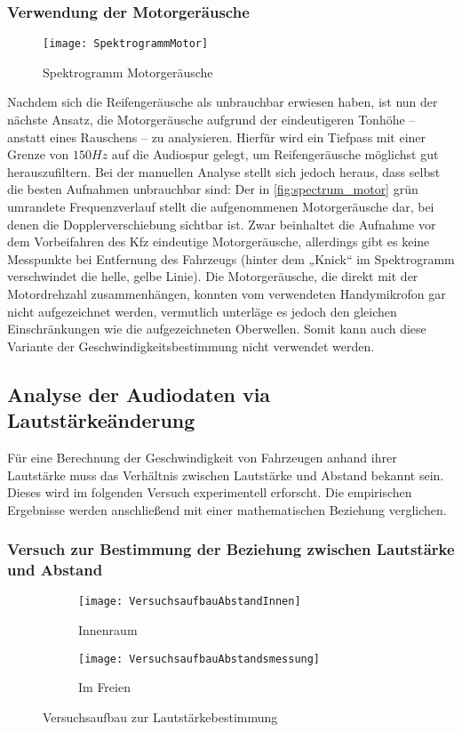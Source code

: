\subsubsection{Verwendung der Motorgeräusche}

\begin{figure}[h]
    \centering
    \texttt{[image: SpektrogrammMotor]}
    \caption{Spektrogramm Motorgeräusche}
    \label{fig:spectrum_motor}
\end{figure}

Nachdem sich die Reifengeräusche als unbrauchbar erwiesen haben, ist nun der nächste Ansatz, die Motorgeräusche aufgrund der eindeutigeren Tonhöhe -- anstatt eines Rauschens -- zu analysieren. Hierfür wird ein Tiefpass mit einer Grenze von \(150 Hz\) auf die Audiospur gelegt, um Reifengeräusche möglichst gut herauszufiltern. Bei der manuellen Analyse stellt sich jedoch heraus, dass selbst die besten Aufnahmen unbrauchbar sind: Der in \autoref{fig:spectrum_motor} grün umrandete Frequenzverlauf stellt die aufgenommenen Motorgeräusche dar, bei denen die Dopplerverschiebung sichtbar ist. Zwar beinhaltet die Aufnahme vor dem Vorbeifahren des Kfz eindeutige Motorgeräusche, allerdings gibt es keine Messpunkte bei Entfernung des Fahrzeugs (hinter dem „Knick“ im Spektrogramm verschwindet die helle, gelbe Linie). Die Motorgeräusche, die direkt mit der Motordrehzahl zusammenhängen, konnten vom verwendeten Handymikrofon gar nicht aufgezeichnet werden, vermutlich unterläge es jedoch den gleichen Einschränkungen wie die aufgezeichneten Oberwellen. Somit kann auch diese Variante der Geschwindigkeitsbestimmung nicht verwendet werden.

\subsection{Analyse der Audiodaten via Lautstärkeänderung}
Für eine Berechnung der Geschwindigkeit von Fahrzeugen anhand ihrer Lautstärke muss das Verhältnis zwischen Lautstärke und Abstand bekannt sein. Dieses wird im folgenden Versuch experimentell erforscht. Die empirischen Ergebnisse werden anschließend mit einer mathematischen Beziehung verglichen.

\subsubsection{Versuch zur Bestimmung der Beziehung zwischen Lautstärke und Abstand}

\begin{figure}[h]
    \begin{subfigure}{.5\textwidth}
        \centering
        \texttt{[image: VersuchsaufbauAbstandInnen]}
        \caption{Innenraum}
        \label{img:dist_room}
    \end{subfigure}
    \begin{subfigure}{.5\textwidth}
        \centering
        \texttt{[image: VersuchsaufbauAbstandsmessung]}
        \caption{Im Freien}
        \label{img:dist_free_field}
    \end{subfigure}
    \caption{Versuchsaufbau zur Lautstärkebestimmung}
    \label{img:versuche_abstand}
\end{figure}

